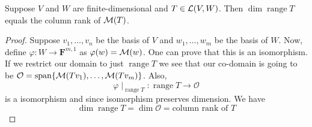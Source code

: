 \begin{proposition}
    Suppose $V$ and $W$ are finite-dimensional and $T \in \operatorname{\mathcal{L}}(V,W)$. Then $\dim \operatorname{range} T$ equals the column rank of 
    $\operatorname{\mathcal{M}}(T)$.
\end{proposition}

\begin{proof}
    Suppose $v_1, \ldots, v_n$ be the basis of $V$ and $w_1, \ldots, w_m$ be the basis of $W$. Now, define 
    $\varphi : W \to \mathbf{F}^{m,1}$ as $\varphi(w)=\operatorname{\mathcal{M}}(w)$. One can prove that this is an isomorphism. If we restrict our domain to just
    $\operatorname{range} T$ we see that our co-domain is going to be $\mathcal{O}=\operatorname{span}\{\operatorname{\mathcal{M}}(Tv_1),\ldots,\operatorname{\mathcal{M}}(Tv_m)\}$. Also,
    \[ \varphi \mid_{\operatorname{range} T} : \operatorname{range} T \to \mathcal{O} \] 
    is a isomorphism and since isomorphism preserves dimension. We have
    \[ \dim \operatorname{range} T = \dim \mathcal{O} = \text{column rank of } T \]
\end{proof}